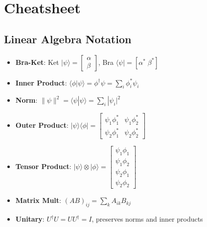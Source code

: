\section{Cheatsheet}\label{sec:cheatsheet}

\begingroup
\setlength{\parindent}{0pt}
\setlength{\parskip}{0pt plus 0.5ex}
\raggedright
\footnotesize

\makeatother

\begin{multicols}{3}

  \section*{Linear Algebra Notation}
  \begin{itemize}[leftmargin=*,nosep,topsep=0pt]
    \item \textbf{Bra-Ket}: Ket $|\psi\rangle = \begin{bmatrix} \alpha \\
      \beta \end{bmatrix}$, Bra $\langle\psi| = [\alpha^* \; \beta^*]$

    \item \textbf{Inner Product}: $\langle\phi|\psi\rangle = \phi^\dagger\psi
      = \sum_i \phi_i^*\psi_i$

    \item \textbf{Norm}: $\|\psi\|^2 = \langle\psi|\psi\rangle = \sum_i
      |\psi_i|^2$

    \item \textbf{Outer Product}: $|\psi\rangle\langle\phi| = \begin{bmatrix}
        \psi_1\phi_1^* & \psi_1\phi_2^* \\ \psi_2\phi_1^* & \psi_2\phi_2^*
      \end{bmatrix}$

    \item \textbf{Tensor Product}: $|\psi\rangle \otimes |\phi\rangle =
      \begin{bmatrix} \psi_1\phi_1 \\ \psi_1\phi_2 \\ \psi_2\phi_1 \\
      \psi_2\phi_2 \end{bmatrix}$

    \item \textbf{Matrix Mult}: $(AB)_{ij} = \sum_k A_{ik}B_{kj}$

    \item \textbf{Unitary}: $U^\dagger U = UU^\dagger = I$, preserves norms
      and inner products


\end{itemize}
\end{multicols}
